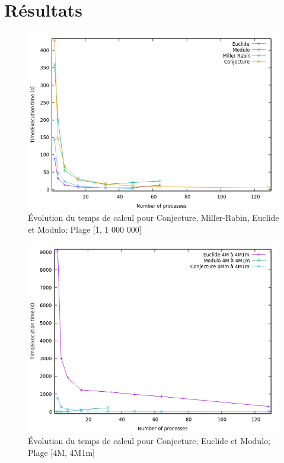 	\section{Résultats}
	\begin{frame}
	
	\begin{figure}[!ht]	
		\begin{center}\includegraphics[scale=0.5]{All_1M.png}\end{center}
		\caption{Évolution du temps de calcul pour Conjecture, Miller-Rabin, Euclide et Modulo; Plage [1, 1 000 000]}
		\label{fg:fig1}
	\end{figure}
	\end{frame}

	\begin{frame}
	\begin{figure}[!ht]	
		\begin{center}\includegraphics[scale=0.5]{All_4M.png}\end{center}
		\caption{Évolution du temps de calcul pour Conjecture, Euclide et Modulo; Plage [4M, 4M1m]}
		\label{fg:fig2}
	\end{figure}	
	\end{frame}
	
